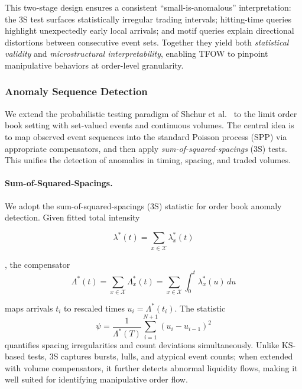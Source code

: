 This two-stage design ensures a consistent ``small-is-anomalous'' interpretation: 
the 3S test surfaces statistically irregular trading intervals; 
hitting-time queries highlight unexpectedly early local arrivals; 
and motif queries explain directional distortions between consecutive event sets. 
Together they yield both \emph{statistical validity} and \emph{microstructural interpretability}, enabling TFOW to pinpoint manipulative behaviors at order-level granularity.


\subsubsection{Anomaly Sequence Detection}
\label{subsec:anomaly-detection}

We extend the probabilistic testing paradigm of Shchur et al.~\cite{Shchur2021DetectingProcesses} 
to the limit order book setting with set-valued events and continuous volumes. 
The central idea is to map observed event sequences into the standard Poisson process (SPP) 
via appropriate compensators, and then apply \emph{sum-of-squared-spacings} (3S) tests. 
This unifies the detection of anomalies in timing, spacing, and traded volumes.

\paragraph{Sum-of-Squared-Spacings.} 
We adopt the sum-of-squared-spacings (3S) statistic for order book anomaly detection. Given fitted total intensity 

\[
\lambda^*(t) = \sum_{x \in \mathcal{X}} \lambda^*_x(t)
\]

, the compensator 
\[
\Lambda^*(t) = \sum_{x \in \mathcal{X}} \Lambda^*_x(t)
= \sum_{x \in \mathcal{X}} \int_0^t \lambda^*_x(u)\,du 
\]

maps arrivals $t_i$ to rescaled times $u_i=\Lambda^*(t_i)$. The statistic
\[
\psi = \frac{1}{\Lambda^*(T)} \sum_{i=1}^{N+1} (u_i - u_{i-1})^2
\]
quantifies spacing irregularities and count deviations simultaneously. Unlike KS-based tests, 3S captures bursts, lulls, and atypical event counts; when extended with volume compensators, it further detects abnormal liquidity flows, making it well suited for identifying manipulative order flow.




